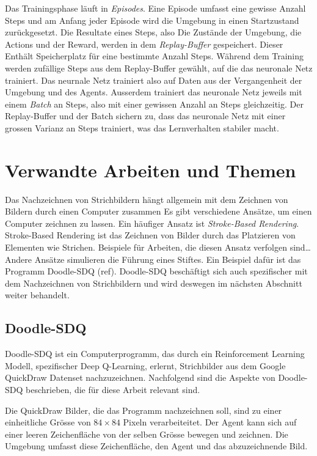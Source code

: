 Das Trainingsphase läuft in \emph{Episodes}. Eine Episode umfasst eine gewisse
Anzahl Steps und am Anfang jeder Episode wird die Umgebung in einen Startzustand
zurückgesetzt. Die Resultate eines Steps, also Die Zustände der Umgebung, die
Actions und der Reward, werden in dem \emph{Replay-Buffer} gespeichert. Dieser
Enthält Speicherplatz für eine bestimmte Anzahl Steps. Während dem Training
werden zufällige Steps aus dem Replay-Buffer gewählt, auf die das neuronale Netz
trainiert. Das neurnale Netz trainiert also auf Daten aus der Vergangenheit
der Umgebung und des Agents. Ausserdem trainiert das neuronale Netz jeweils mit
einem \emph{Batch} an Steps, also mit einer gewissen Anzahl an Steps
gleichzeitig. Der Replay-Buffer und der Batch sichern zu, dass das neuronale
Netz mit einer grossen Varianz an Steps trainiert, was das Lernverhalten
stabiler macht.


\section{Verwandte Arbeiten und Themen}
\label{chap:t_verwandt}
Das Nachzeichnen von Strichbildern hängt allgemein mit dem Zeichnen von Bildern
durch einen Computer zusammen Es gibt verschiedene Ansätze, um einen Computer
zeichnen zu lassen. Ein häufiger Ansatz ist \emph{Stroke-Based Rendering}.
Stroke-Based Rendering ist das Zeichnen von Bilder durch das Platzieren von
Elementen wie Strichen. Beispiele für Arbeiten, die diesen Ansatz verfolgen
sind\dots     %
Andere Ansätze simulieren die Führung eines Stiftes. Ein Beispiel dafür ist das
Programm Doodle-SDQ (ref). Doodle-SDQ beschäftigt sich auch spezifischer mit dem
Nachzeichnen von Strichbildern und wird deswegen im nächsten Abschnitt weiter
behandelt. %

\subsection*{Doodle-SDQ}
Doodle-SDQ ist ein Computerprogramm, das durch ein Reinforcement Learning
Modell, spezifischer Deep Q-Learning, erlernt, Strichbilder aus dem Google
QuickDraw Datenset nachzuzeichnen. Nachfolgend sind die Aspekte von Doodle-SDQ
beschrieben, die für diese Arbeit relevant sind.

Die QuickDraw Bilder, die das Programm nachzeichnen soll, sind zu einer
einheitliche Grösse von $84\times84$ Pixeln verarbeiteitet. Der Agent kann sich
auf einer leeren Zeichenfläche von der selben Grösse bewegen und zeichnen. Die
Umgebung umfasst diese Zeichenfläche, den Agent und das abzuzeichnende Bild.

